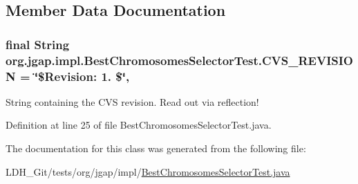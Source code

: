 \subsection{Member Data Documentation}
\hypertarget{classorg_1_1jgap_1_1impl_1_1_best_chromosomes_selector_test_a8aed148320deaab264d956cf0791a9ec}{
\subsubsection[{C\-V\-S\-\_\-\-R\-E\-V\-I\-S\-I\-O\-N}]{\setlength{\rightskip}{0pt plus 5cm}final String org.\-jgap.\-impl.\-Best\-Chromosomes\-Selector\-Test.\-C\-V\-S\-\_\-\-R\-E\-V\-I\-S\-I\-O\-N = \char`\"{}\$Revision\-: 1. \$\char`\"{}\hspace{0.3cm}{\ttfamily [static]}, {\ttfamily [private]}}}\label{classorg_1_1jgap_1_1impl_1_1_best_chromosomes_selector_test_a8aed148320deaab264d956cf0791a9ec}
String containing the C\-V\-S revision. Read out via reflection! 

Definition at line 25 of file Best\-Chromosomes\-Selector\-Test.\-java.



The documentation for this class was generated from the following file\-:\begin{DoxyCompactItemize}
\item 
L\-D\-H\-\_\-\-Git/tests/org/jgap/impl/\hyperlink{_best_chromosomes_selector_test_8java}{Best\-Chromosomes\-Selector\-Test.\-java}\end{DoxyCompactItemize}
